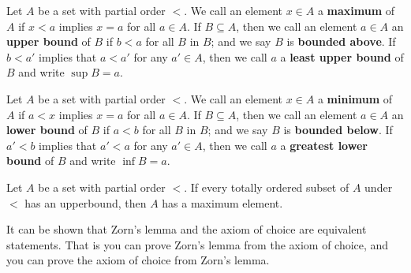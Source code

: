 \begin{definition}
    Let $A$ be a set with partial order  $<$. We call an element  $x \in A$ a
    \textbf{maximum} of $A$ if  $x<a$ implies  $x=a$ for all $a \in A$. If $B
    \subseteq A$, then we call an element $a \in A$ an \textbf{upper bound} of
    $B$ if  $b<a$ for all  $B$ in  $B$; and we say  $B$ is  \textbf{bounded
    above}. If $b<a'$ implies that  $a<a'$ for any  $a' \in A$, then we call
    $a$ a  \textbf{least upper bound} of $B$ and write  $\sup{B}=a$.
\end{definition}

\begin{definition}
    Let $A$ be a set with partial order  $<$. We call an element  $x \in A$ a
    \textbf{minimum} of $A$ if  $a<x$ implies  $x=a$ for all $a \in A$. If $B
    \subseteq A$, then we call an element $a \in A$ an \textbf{lower bound} of
    $B$ if  $a<b$ for all  $B$ in  $B$; and we say  $B$ is  \textbf{bounded
    below}. If $a'<b$ implies that  $a'<a$ for any  $a' \in A$, then we call
    $a$ a  \textbf{greatest lower bound} of $B$ and write  $\inf{B}=a$.
\end{definition}

\begin{theorem}\label{thm_2}
    Let $A$ be a set with partial order  $<$. If every totally ordered subset of
    $A$ under  $<$ has an upperbound, then  $A$ has a maximum element.
\end{theorem}
\begin{remark}
    It can be shown that Zorn's lemma and the axiom of choice are equivalent
    statements. That is you can prove Zorn's lemma from the axiom of choice, and
    you can prove the axiom of choice from Zorn's lemma.
\end{remark}

